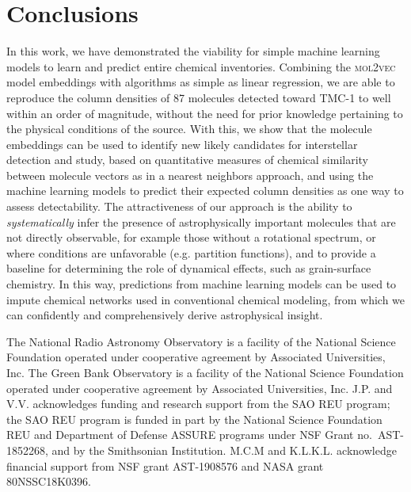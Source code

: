 \documentclass[twocolumn]{aastex63}
\begin{document}
\section{Conclusions}

In this work, we have demonstrated the viability for simple machine learning models to learn and predict entire chemical inventories. Combining the \textsc{mol2vec} model embeddings with algorithms as simple as linear regression, we are able to reproduce the column densities of 87 molecules detected toward TMC-1 to well within an order of magnitude, without the need for prior knowledge pertaining to the physical conditions of the source. With this, we show that the molecule embeddings can be used to identify new likely candidates for interstellar detection and study, based on quantitative measures of chemical similarity between molecule vectors as in a nearest neighbors approach, and using the machine learning models to predict their expected column densities as one way to assess detectability. The attractiveness of our approach is the ability to \emph{systematically} infer the presence of astrophysically important molecules that are not directly observable, for example those without a rotational spectrum, or where conditions are unfavorable (e.g. partition functions), and to provide a baseline for determining the role of dynamical effects, such as grain-surface chemistry. In this way, predictions from machine learning models can be used to impute chemical networks used in conventional chemical modeling, from which we can confidently and comprehensively derive astrophysical insight. 

\acknowledgments

The National Radio Astronomy Observatory is a facility of the National Science Foundation operated under cooperative agreement by Associated Universities, Inc.  The Green Bank Observatory is a facility of the National Science Foundation operated under cooperative agreement by Associated Universities, Inc. J.P. and V.V. acknowledges funding and research support from the SAO REU program; the SAO REU program is funded in part by the National Science Foundation REU and Department of Defense ASSURE programs under NSF Grant no.\ AST-1852268, and by the Smithsonian Institution. M.C.M and K.L.K.L. acknowledge financial support from NSF grant AST-1908576 and NASA grant 80NSSC18K0396.

\newpage



\end{document}
